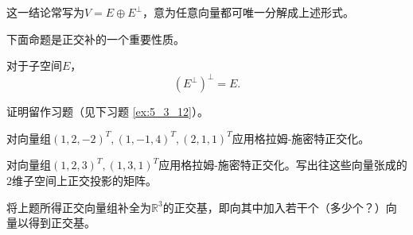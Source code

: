 这一结论常写为$V=E\oplus E^\perp$，意为任意向量都可唯一分解成上述形式。

下面命题是正交补的一个重要性质。

\begin{proposition}
    对于子空间$E$，\[(E^\perp)^\perp=E.\]
\end{proposition}

证明留作习题（见下习题 \ref{ex:5_3_12}）。

\begin{problemset}
    \item 对向量组$(1,2,-2)^T,(1,-1,4)^T,(2,1,1)^T$应用格拉姆-施密特正交化。
    \item 对向量组$(1,2,3)^T,(1,3,1)^T$应用格拉姆-施密特正交化。写出往这些向量张成的$2$维子空间上正交投影的矩阵。
    \item 将上题所得正交向量组补全为$\mathbb{R}^3$的正交基，即向其中加入若干个（多少个？）向量以得到正交基。
    

\end{problemset}

